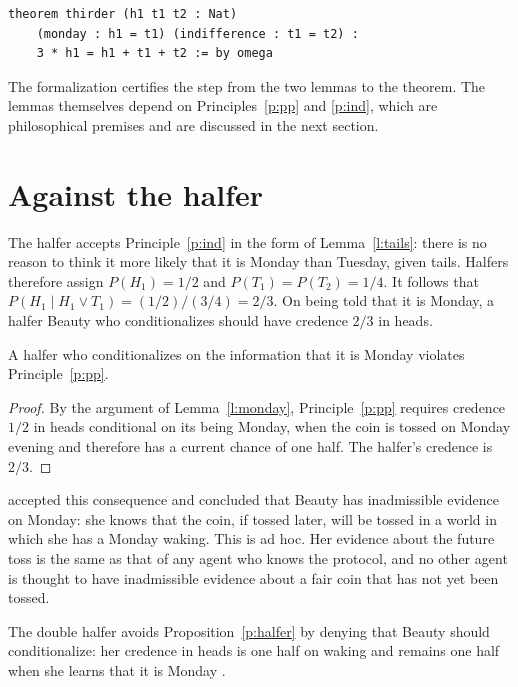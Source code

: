 \documentclass{situationist-preprint}
\begin{document}
\begin{lstlisting}
theorem thirder (h1 t1 t2 : Nat)
    (monday : h1 = t1) (indifference : t1 = t2) :
    3 * h1 = h1 + t1 + t2 := by omega
\end{lstlisting}

The formalization certifies the step from the two lemmas to the theorem. The lemmas themselves depend on Principles~\ref{p:pp} and \ref{p:ind}, which are philosophical premises and are discussed in the next section.

\section{Against the halfer}

The halfer accepts Principle~\ref{p:ind} in the form of Lemma~\ref{l:tails}: there is no reason to think it more likely that it is Monday than Tuesday, given tails. Halfers therefore assign $P(H_1) = 1/2$ and $P(T_1) = P(T_2) = 1/4$. It follows that $P(H_1 \mid H_1 \vee T_1) = (1/2)/(3/4) = 2/3$. On being told that it is Monday, a halfer Beauty who conditionalizes should have credence $2/3$ in heads.

\begin{proposition}\label{p:halfer}
A halfer who conditionalizes on the information that it is Monday violates Principle~\ref{p:pp}.
\end{proposition}

\begin{proof}
By the argument of Lemma~\ref{l:monday}, Principle~\ref{p:pp} requires credence $1/2$ in heads conditional on its being Monday, when the coin is tossed on Monday evening and therefore has a current chance of one half. The halfer's credence is $2/3$.
\end{proof}

\citet{Lewis2001} accepted this consequence and concluded that Beauty has inadmissible evidence on Monday: she knows that the coin, if tossed later, will be tossed in a world in which she has a Monday waking. This is ad hoc. Her evidence about the future toss is the same as that of any agent who knows the protocol, and no other agent is thought to have inadmissible evidence about a fair coin that has not yet been tossed.

\begin{objection}
The double halfer avoids Proposition~\ref{p:halfer} by denying that Beauty should conditionalize: her credence in heads is one half on waking and remains one half when she learns that it is Monday \citep{Meacham2008}.
\end{objection}
\end{document}

